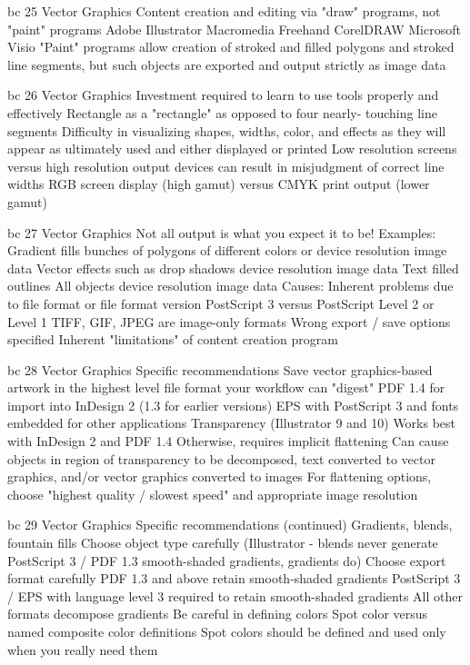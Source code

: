 \documentclass[11pt,a4paper]{article}
\begin{document}
bc 25 Vector Graphics Content creation and editing via "draw" programs, not "paint" programs Adobe Illustrator Macromedia Freehand CorelDRAW Microsoft Visio "Paint" programs allow creation of stroked and filled polygons and stroked line segments, but such objects are exported and output strictly as image data

bc 26 Vector Graphics Investment required to learn to use tools properly and effectively Rectangle as a "rectangle" as opposed to four nearly- touching line segments Difficulty in visualizing shapes, widths, color, and effects as they will appear as ultimately used and either displayed or printed Low resolution screens versus high resolution output devices can result in misjudgment of correct line widths RGB screen display (high gamut) versus CMYK print output (lower gamut)

bc 27 Vector Graphics Not all output is what you expect it to be! Examples: Gradient fills bunches of polygons of different colors or device resolution image data Vector effects such as drop shadows device resolution image data Text filled outlines All objects device resolution image data Causes: Inherent problems due to file format or file format version PostScript 3 versus PostScript Level 2 or Level 1 TIFF, GIF, JPEG are image-only formats Wrong export / save options specified Inherent "limitations" of content creation program

bc 28 Vector Graphics Specific recommendations Save vector graphics-based artwork in the highest level file format your workflow can "digest" PDF 1.4 for import into InDesign 2 (1.3 for earlier versions) EPS with PostScript 3 and fonts embedded for other applications Transparency (Illustrator 9 and 10) Works best with InDesign 2 and PDF 1.4 Otherwise, requires implicit flattening Can cause objects in region of transparency to be decomposed, text converted to vector graphics, and/or vector graphics converted to images For flattening options, choose "highest quality / slowest speed" and appropriate image resolution

bc 29 Vector Graphics Specific recommendations (continued) Gradients, blends, fountain fills Choose object type carefully (Illustrator - blends never generate PostScript 3 / PDF 1.3 smooth-shaded gradients, gradients do) Choose export format carefully PDF 1.3 and above retain smooth-shaded gradients PostScript 3 / EPS with language level 3 required to retain smooth-shaded gradients All other formats decompose gradients Be careful in defining colors Spot color versus named composite color definitions Spot colors should be defined and used only when you really need them
\end{document}
